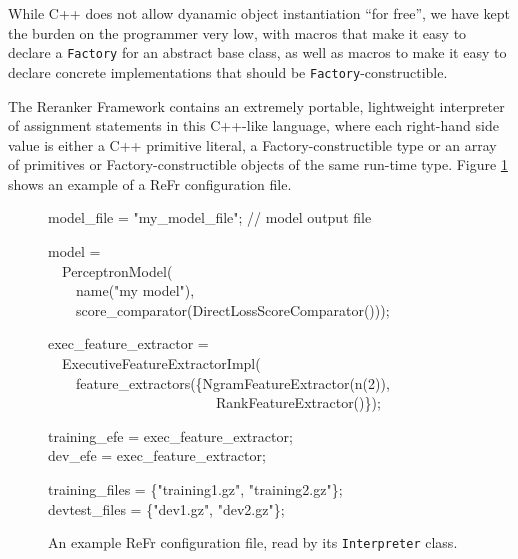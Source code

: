 \documentclass[a4paper]{article}
\newcommand\inlinecode[1]{\scriptsize\texttt{#1}\normalsize}
\let\textquotedbl="
\newenvironment{lyxcode}
{\par\begin{list}{}{
\scriptsize
\setlength{\leftmargin}{0.1in}
\setlength{\rightmargin}{\leftmargin}
\setlength{\listparindent}{0pt}%
\raggedright
\setlength{\itemsep}{0pt}
\setlength{\parsep}{0pt}
\normalfont\ttfamily}%
 \item[]}
{\end{list}}
\begin{document}




While C++ does not allow dyanamic object instantiation ``for free'',
we have kept the burden on the programmer very low, with macros that
make it easy to declare a \texttt{Factory} for an abstract base class,
as well as macros to make it easy to declare concrete implementations
that should be \texttt{Factory}-constructible.


The Reranker Framework contains an extremely portable, lightweight
interpreter of assignment statements in this C++-like language, where each right-hand side value is either a C++ primitive literal, a
Factory-constructible type or an array of primitives or Factory-constructible objects of the same run-time type. Figure \ref{fig:interpreter-config} shows an example of a ReFr configuration file.


\begin{figure}
\begin{lyxcode}
\scriptsize
model\_file = \textquotedbl my\_model\_file\textquotedbl;  // model output file

model =\\
~~PerceptronModel(\\
~~~~name(\textquotedbl my model\textquotedbl),\\
~~~~score\_comparator(DirectLossScoreComparator()));

exec\_feature\_extractor =\\
~~ExecutiveFeatureExtractorImpl(\\
~~~~feature\_extractors(\{NgramFeatureExtractor(n(2)),\\
~~~~~~~~~~~~~~~~~~~~~~~~RankFeatureExtractor()\});

training\_efe = exec\_feature\_extractor;\\
dev\_efe = exec\_feature\_extractor;

training\_files = \{\textquotedbl training1.gz\textquotedbl,
\textquotedbl training2.gz\textquotedbl\};\\
devtest\_files = \{\textquotedbl dev1.gz\textquotedbl,
\textquotedbl dev2.gz\textquotedbl\};
\normalsize
\end{lyxcode}
\vspace{-0.2in}
\caption{\label{fig:interpreter-config}An example ReFr configuration file, read by its \inlinecode{Interpreter} class.}
\end{figure}
\end{document}

